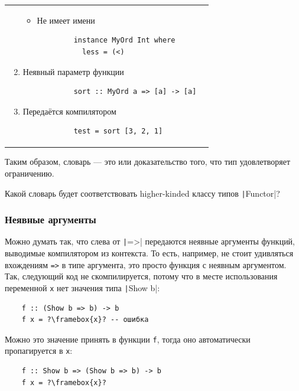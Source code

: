 \begin{tabular}{p{8cm}p{8cm}}
\begin{enumerate}
        \begin{itemize}
            \item Не имеет имени
        \end{itemize}
        \begin{verbatim}
            instance MyOrd Int where
              less = (<)
        \end{verbatim}
        \item Неявный параметр функции
        \begin{verbatim}
            sort :: MyOrd a => [a] -> [a]
        \end{verbatim}
        \item Передаётся компилятором
        \begin{verbatim}
            test = sort [3, 2, 1]
        \end{verbatim}
    \end{enumerate}
\end{tabular}

Таким образом, словарь --- это  или доказательство того, что тип удовлетворяет ограничению.

\begin{task}
    Какой словарь будет соответствовать higher-kinded классу типов \texttt|Functor|?
\end{task}

\subsubsection{Неявные аргументы} \label{subsubsec:ad-hoc-implicits}

Можно думать так, что слева от \texttt|=>| передаются неявные аргументы функций, выводимые компилятором из контекста.
То есть, например, не стоит удивляться вхождениям \texttt{=>} в типе аргумента, это просто функция с неявным аргументом.
Так, следующий код не скомпилируется, потому что в месте использования переменной \texttt{x} нет значения типа \texttt|Show b|:
\begin{verbatim}
    f :: (Show b => b) -> b
    f x = ?\framebox{x}? -- ошибка
\end{verbatim}
Можно это значение принять в функции \texttt{f}, тогда оно автоматически пропагируется в \texttt{x}:
\begin{verbatim}
    f :: Show b => (Show b => b) -> b
    f x = ?\framebox{x}?
\end{verbatim}

